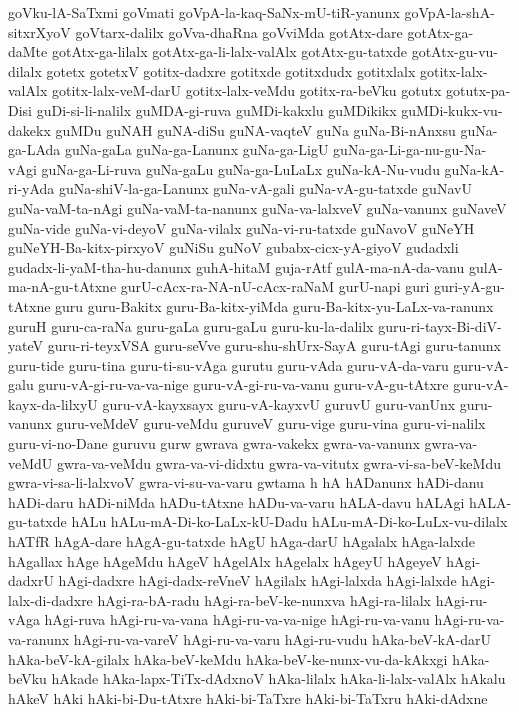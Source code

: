 {goVku-lA-SaTxmi
goVmati
goVpA-la-kaq-SaNx-mU-tiR-yanunx
goVpA-la-shA-sitxrXyoV
goVtarx-dalilx
goVva-dhaRna
goVviMda
gotAtx-dare
gotAtx-ga-daMte
gotAtx-ga-lilalx
gotAtx-ga-li-lalx-valAlx
gotAtx-gu-tatxde
gotAtx-gu-vu-dilalx
gotetx
gotetxV
gotitx-dadxre
gotitxde
gotitxdudx
gotitxlalx
gotitx-lalx-valAlx
gotitx-lalx-veM-darU
gotitx-lalx-veMdu
gotitx-ra-beVku
gotutx
gotutx-pa-Disi
guDi-si-li-nalilx
guMDA-gi-ruva
guMDi-kakxlu
guMDikikx
guMDi-kukx-vu-dakekx
guMDu
guNAH
guNA-diSu
guNA-vaqteV
guNa
guNa-Bi-nAnxsu
guNa-ga-LAda
guNa-gaLa
guNa-ga-Lanunx
guNa-ga-LigU
guNa-ga-Li-ga-nu-gu-Na-vAgi
guNa-ga-Li-ruva
guNa-gaLu
guNa-ga-LuLaLx
guNa-kA-Nu-vudu
guNa-kA-ri-yAda
guNa-shiV-la-ga-Lanunx
guNa-vA-gali
guNa-vA-gu-tatxde
guNavU
guNa-vaM-ta-nAgi
guNa-vaM-ta-nanunx
guNa-va-lalxveV
guNa-vanunx
guNaveV
guNa-vide
guNa-vi-deyoV
guNa-vilalx
guNa-vi-ru-tatxde
guNavoV
guNeYH
guNeYH-Ba-kitx-pirxyoV
guNiSu
guNoV
gubabx-cicx-yA-giyoV
gudadxli
gudadx-li-yaM-tha-hu-danunx
guhA-hitaM
guja-rAtf
gulA-ma-nA-da-vanu
gulA-ma-nA-gu-tAtxne
gurU-cAcx-ra-NA-nU-cAcx-raNaM
gurU-napi
guri
guri-yA-gu-tAtxne
guru
guru-Bakitx
guru-Ba-kitx-yiMda
guru-Ba-kitx-yu-LaLx-va-ranunx
guruH
guru-ca-raNa
guru-gaLa
guru-gaLu
guru-ku-la-dalilx
guru-ri-tayx-Bi-diV-yateV
guru-ri-teyxVSA
guru-seVve
guru-shu-shUrx-SayA
guru-tAgi
guru-tanunx
guru-tide
guru-tina
guru-ti-su-vAga
gurutu
guru-vAda
guru-vA-da-varu
guru-vA-galu
guru-vA-gi-ru-va-va-nige
guru-vA-gi-ru-va-vanu
guru-vA-gu-tAtxre
guru-vA-kayx-da-lilxyU
guru-vA-kayxsayx
guru-vA-kayxvU
guruvU
guru-vanUnx
guru-vanunx
guru-veMdeV
guru-veMdu
guruveV
guru-vige
guru-vina
guru-vi-nalilx
guru-vi-no-Dane
guruvu
gurw
gwrava
gwra-vakekx
gwra-va-vanunx
gwra-va-veMdU
gwra-va-veMdu
gwra-va-vi-didxtu
gwra-va-vitutx
gwra-vi-sa-beV-keMdu
gwra-vi-sa-li-lalxvoV
gwra-vi-su-va-varu
gwtama
h
hA
hADanunx
hADi-danu
hADi-daru
hADi-niMda
hADu-tAtxne
hADu-va-varu
hALA-davu
hALAgi
hALA-gu-tatxde
hALu
hALu-mA-Di-ko-LaLx-kU-Dadu
hALu-mA-Di-ko-LuLx-vu-dilalx
hATfR
hAgA-dare
hAgA-gu-tatxde
hAgU
hAga-darU
hAgalalx
hAga-lalxde
hAgallax
hAge
hAgeMdu
hAgeV
hAgelAlx
hAgelalx
hAgeyU
hAgeyeV
hAgi-dadxrU
hAgi-dadxre
hAgi-dadx-reVneV
hAgilalx
hAgi-lalxda
hAgi-lalxde
hAgi-lalx-di-dadxre
hAgi-ra-bA-radu
hAgi-ra-beV-ke-nunxva
hAgi-ra-lilalx
hAgi-ru-vAga
hAgi-ruva
hAgi-ru-va-vana
hAgi-ru-va-va-nige
hAgi-ru-va-vanu
hAgi-ru-va-va-ranunx
hAgi-ru-va-vareV
hAgi-ru-va-varu
hAgi-ru-vudu
hAka-beV-kA-darU
hAka-beV-kA-gilalx
hAka-beV-keMdu
hAka-beV-ke-nunx-vu-da-kAkxgi
hAka-beVku
hAkade
hAka-lapx-TiTx-dAdxnoV
hAka-lilalx
hAka-li-lalx-valAlx
hAkalu
hAkeV
hAki
hAki-bi-Du-tAtxre
hAki-bi-TaTxre
hAki-bi-TaTxru
hAki-dAdxne
}
